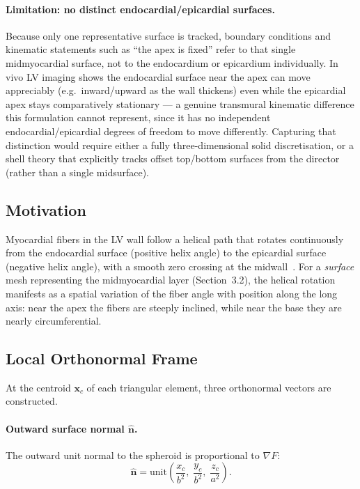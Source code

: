 \documentclass[11pt,a4paper]{article}
\newcommand{\bn}{\hat{\mathbf{n}}}
\newcommand{\bx}{\mathbf{x}}
\begin{document}
\paragraph{Limitation: no distinct endocardial/epicardial surfaces.}
Because only one representative surface is tracked, boundary conditions and
kinematic statements such as ``the apex is fixed'' refer to that single
midmyocardial surface, not to the endocardium or epicardium individually.
In vivo LV imaging shows the endocardial surface near the apex can move
appreciably (e.g.\ inward/upward as the wall thickens) even while the
epicardial apex stays comparatively stationary — a genuine transmural
kinematic difference this formulation cannot represent, since it has no
independent endocardial/epicardial degrees of freedom to move differently.
Capturing that distinction would require either a fully three-dimensional
solid discretisation, or a shell theory that explicitly tracks offset
top/bottom surfaces from the director (rather than a single midsurface).

\subsection{Motivation}

Myocardial fibers in the LV wall follow a helical path that rotates
continuously from the endocardial surface (positive helix angle) to the
epicardial surface (negative helix angle), with a smooth zero crossing at the
midwall~\cite{Streeter1969,Holzapfel2009}.  For a \emph{surface} mesh
representing the midmyocardial layer (Section~3.2), the helical rotation
manifests as a spatial variation of the fiber angle with position along the
long axis: near the apex the fibers are steeply inclined, while near the base
they are nearly circumferential.

\subsection{Local Orthonormal Frame}

At the centroid $\bx_c$ of each triangular element, three orthonormal vectors
are constructed.

\paragraph{Outward surface normal $\bn$.}
The outward unit normal to the spheroid is proportional to $\nabla F$:
\begin{equation}
  \bn = \mathrm{unit}\!\left(\frac{x_c}{b^2},\;\frac{y_c}{b^2},\;
                               \frac{z_c}{a^2}\right).
  \label{eq:normal}
\end{equation}
\end{document}
